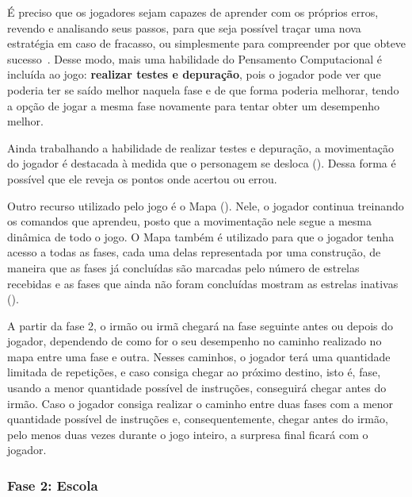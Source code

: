 É preciso que os jogadores sejam capazes de aprender com os próprios erros, revendo e analisando seus passos, para que seja possível traçar uma nova estratégia em caso de fracasso, ou simplesmente para compreender por que obteve sucesso~\cite{paula_jogos_2016}. Desse modo, mais uma habilidade do Pensamento Computacional é incluída ao jogo: \textbf{realizar testes e depuração}, pois o jogador pode ver que poderia ter se saído melhor naquela fase e de que forma poderia melhorar, tendo a opção de jogar a mesma fase novamente para tentar obter um desempenho melhor.

Ainda trabalhando a habilidade de realizar testes e depuração, a movimentação do jogador é destacada à medida que o personagem se desloca (). Dessa forma é possível que ele reveja os pontos onde acertou ou errou.


Outro recurso utilizado pelo jogo é o Mapa (). Nele, o jogador continua treinando os comandos que aprendeu, posto que a movimentação nele segue a mesma dinâmica de todo o jogo. O Mapa também é utilizado para que o jogador tenha acesso a todas as fases, cada uma delas representada por uma construção, de maneira que as fases já concluídas são marcadas pelo número de estrelas recebidas e as fases que ainda não foram concluídas mostram as estrelas inativas ().


A partir da fase 2, o irmão ou irmã chegará na fase seguinte antes ou depois do jogador, dependendo de como for o seu desempenho no caminho realizado no mapa entre uma fase e outra. Nesses caminhos, o jogador terá uma quantidade limitada de repetições, e caso consiga chegar ao próximo destino, isto é, fase, usando a menor quantidade possível de instruções,  conseguirá chegar antes do irmão. Caso o jogador consiga realizar o caminho entre duas fases com a menor quantidade possível de instruções e, consequentemente, chegar antes do irmão, pelo menos duas vezes durante o jogo inteiro, a surpresa final ficará com o jogador. 

\subsubsection{Fase 2: Escola} \label{sssec:fase_2}

